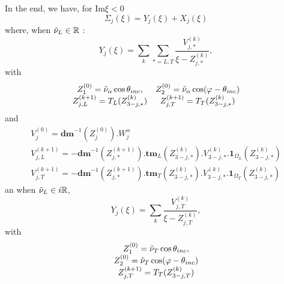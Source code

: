 In the end, we have, for  $\mbox{Im} \xi <0$
\begin{equation}
\Sigma_j(\xi)=Y_j(\xi)+X_j(\xi) \label{C4:decomp}
\end{equation}
where, when $\tilde{\nu}_L \in \mathbb{R}$ :
\begin{equation}
Y_j(\xi)=\sum_k \sum_{*=L,T} \frac{V_{j,*}^{(k)}}{\xi-Z_{j,*}^{(k)}}
\label{C4:yj},
\end{equation}
with
\begin{equation}
\begin{matrix}
Z_{1}^{(0)}=\tilde{\nu}_{\alpha} \cos \theta_{inc},  & Z_{2}^{(0)}=\tilde{\nu}_{\alpha} \cos(\varphi-\theta_{inc}) \\
Z_{j,L}^{(k+1)}= T_L(Z_{3-j,*}^{(k)}) &Z_{j,T}^{(k+1)}= T_T(Z_{3-j,*}^{(k)}) 
\end{matrix}
\label{C4:poles}
\end{equation}
and
\begin{equation}
\begin{matrix}
V_{j}^{(0)}=\textbf{dm}^{-1}(Z_{j}^{(0)}).W_j^{\alpha}\\
V_{j,L}^{(k+1)}=-\textbf{dm}^{-1}(Z_{j,*}^{(k+1)}).\textbf{tm}_L(Z_{3-j,*}^{(k)}).V_{3-j,*}^{(k)}.\textbf{1}_{\Omega_L}(Z_{3-j,*}^{(k)}) \\ 
V_{j,T}^{(k+1)}=-\textbf{dm}^{-1}(Z_{j,*}^{(k+1)}).\textbf{tm}_T(Z_{3-j,*}^{(k)}).V_{3-j,*}^{(k)}.\textbf{1}_{\Omega_T}(Z_{3-j,*}^{(k)}) 
\end{matrix}
\label{C4:residus}
\end{equation}
an when $\tilde{\nu}_L \in i\mathbb{R}$,
\begin{equation}
Y_j(\xi)=\sum_k \frac{V_{j,T}^{(k)}}{\xi-Z_{j,T}^{(k)}}
\label{C4:yjcr},
\end{equation}
with
\begin{equation}
\begin{matrix}
Z_{1}^{(0)}=\tilde{\nu}_T \cos \theta_{inc},\\ 
Z_{2}^{(0)}=\tilde{\nu}_T \cos(\varphi-\theta_{inc})\\
Z_{j,T}^{(k+1)}= T_T(Z_{3-j,T}^{(k)}) 
\end{matrix}
\label{C4:polescr}
\end{equation}
